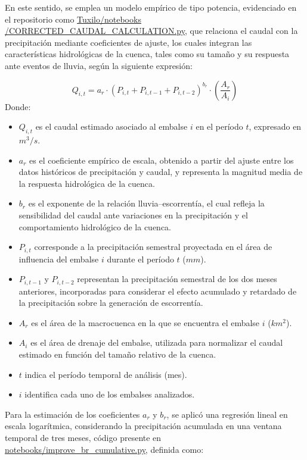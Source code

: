 En este sentido, se emplea un modelo empírico de tipo potencia, evidenciado en el repositorio como \url{    Tuxilo/notebooks

/CORRECTED_CAUDAL_CALCULATION.py}, que relaciona el caudal con la precipitación mediante coeficientes de ajuste, los cuales integran las características hidrológicas de la cuenca, tales como su tamaño y su respuesta ante eventos de lluvia, según la siguiente expresión:

\begin{equation}
Q_{i,t} = a_r \cdot \left( P_{i,t} + P_{i,t-1} + P_{i,t-2} \right)^{b_r} \cdot \left( \frac{A_r}{A_i} \right)
\end{equation}
Donde:

\begin{itemize}
    \item $Q_{i,t}$ es el caudal estimado asociado al embalse $i$ en el período $t$, expresado en $m^{3}/s$.
    \item $a_r$ es el coeficiente empírico de escala, obtenido a partir del ajuste entre los datos históricos de precipitación y caudal, y representa la magnitud media de la respuesta hidrológica de la cuenca.
    \item $b_r$ es el exponente de la relación lluvia--escorrentía, el cual refleja la sensibilidad del caudal ante variaciones en la precipitación y el comportamiento hidrológico de la cuenca.
    \item $P_{i,t}$ corresponde a la precipitación semestral proyectada en el área de influencia del embalse $i$ durante el período $t$ ($mm$).
    \item $P_{i,t-1}$ y $P_{i,t-2}$ representan la precipitación semestral de los dos meses anteriores, incorporadas para considerar el efecto acumulado y retardado de la precipitación sobre la generación de escorrentía.
    \item $A_r$ es el área de la macrocuenca en la que se encuentra el embalse $i$ ($km^{2}$).
    \item $A_i$ es el área de drenaje del embalse, utilizada para normalizar el caudal estimado en función del tamaño relativo de la cuenca.
    \item $t$ indica el período temporal de análisis (mes).
    \item $i$ identifica cada uno de los embalses analizados.
\end{itemize}

Para la estimación de los coeficientes $a_r$ y $b_r$, se aplicó una regresión lineal en escala logarítmica, considerando la precipitación acumulada en una ventana temporal de tres meses, código presente en \url{notebooks/improve_br_cumulative.py}, definida como:

